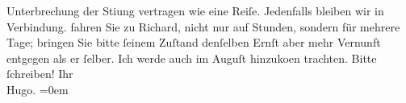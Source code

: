 \begin{ledgroupsized}[t]{13cm}
                    Unterbrechung der Sti{\geminationm}ung vertragen wie eine
                    Reiſe.\pend
           \pstart
           Jedenfalls bleiben wir in Verbindung. 
                    fahren Sie zu Richard, nicht nur auf
                    Stunden, sondern für mehrere Tage; bringen Sie bitte ſeinem Zuſtand denſelben
                    Ernſt aber mehr {\pb}Vernunft
                    entgegen als er ſelber. Ich werde auch im Auguſt hinzuko{\geminationm}en trachten.\pend
           \pstart
           Bitte ſchreiben!\pend
           \pstart
           Ihr{\\[\baselineskip]}\spacefill\mbox{Hugo.}\pend
           \leftskip=0em{}          \endnumbering{}\end{ledgroupsized}  \newcommand{\dateiname}{L00944}\newcommand{\titel}{Hugo von Hofmannsthal an Arthur Schnitzler, 15. 7. [1899]}\newcommand{\editorInnen}{Martin Anton Müller und Gerd-Hermann Susen}
      